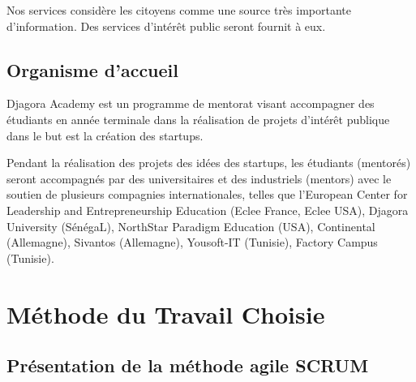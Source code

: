 Nos services considère les citoyens comme une source très
importante d'information. Des services d'intérêt public seront fournit à eux.

\subsection{Organisme d'accueil}

Djagora Academy est un programme de mentorat visant accompagner des étudiants
en année terminale dans la réalisation de projets d'intérêt publique dans le but
est la création des startups.

Pendant la réalisation des projets des idées des startups, les étudiants
(mentorés)  seront accompagnés par des universitaires et des industriels
(mentors) avec le soutien de plusieurs compagnies internationales, telles que
l'European Center for Leadership and Entrepreneurship Education (Eclee France,
Eclee USA), Djagora University (SénégaL), NorthStar Paradigm Education (USA),
Continental (Allemagne), Sivantos (Allemagne), Yousoft-IT (Tunisie),
Factory Campus (Tunisie).


\section{Méthode du Travail Choisie}
\subsection{Présentation de la méthode agile SCRUM}

